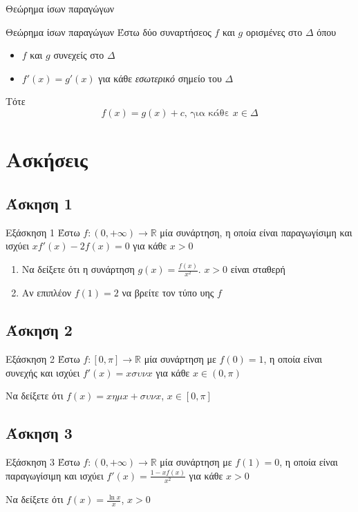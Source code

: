 \documentclass[greek]{beamer}
\begin{document}
\begin{frame}{Θεώρημα ίσων παραγώγων}
  \begin{block}{Θεώρημα ίσων παραγώγων}
    Έστω δύο συναρτήσεος $f$ και $g$ ορισμένες στο $Δ$ όπου
    \begin{itemize}
      \item $f$ και $g$ συνεχείς στο $Δ$
      \item $f'(x)=g'(x)$ για κάθε \emph{εσωτερικό} σημείο του $Δ$
    \end{itemize}
    Τότε
    $$f(x)=g(x)+c \text{, για κάθε } x\in Δ$$
  \end{block}
\end{frame}

\section{Ασκήσεις}
\subsection{Άσκηση 1}
\begin{frame}[label=Άσκηση1]{Εξάσκηση 1}
  Έστω $f:(0,+\infty)\to\mathbb{R}$ μία συνάρτηση, η οποία είναι παραγωγίσιμη και ισχύει $xf'(x)-2f(x)=0$ για κάθε $x>0$
  \begin{enumerate}
    \item<1-> Να δείξετε ότι η συνάρτηση $g(x)=\frac{f(x)}{x^2}$. $x>0$ είναι σταθερή
    \item<2-> Αν επιπλέον $f(1)=2$ να βρείτε τον τύπο υης $f$
  \end{enumerate}

\end{frame}

\subsection{Άσκηση 2}
\begin{frame}[label=Άσκηση2]{Εξάσκηση 2}
  Έστω $f:[0,π]\to\mathbb{R}$ μία συνάρτηση με $f(0)=1$, η οποία είναι συνεχής και ισχύει $f'(x)=xσυνx$ για κάθε $x\in (0,π)$

  Να δείξετε ότι $f(x)=xημx+συνx$, $x\in [0,π]$

\end{frame}

\subsection{Άσκηση 3}
\begin{frame}[label=Άσκηση3]{Εξάσκηση 3}
  Έστω $f:(0,+\infty)\to\mathbb{R}$ μία συνάρτηση με $f(1)=0$, η οποία είναι παραγωγίσιμη και ισχύει $f'(x)=\frac{1-xf(x)}{x^2}$ για κάθε $x>0$

  Να δείξετε ότι $f(x)=\frac{\ln x}{x}$, $x>0$

\end{frame}
\end{document}
